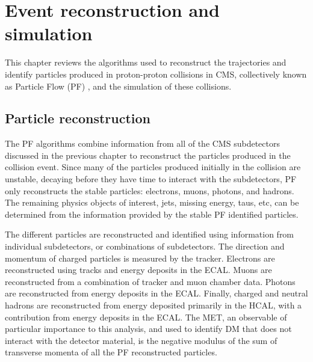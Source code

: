 \chapter{Event reconstruction and simulation}

This chapter reviews the algorithms used to reconstruct the trajectories and identify particles produced in proton-proton collisions in CMS, collectively known as Particle Flow (PF) \cite{CMS:2009nxa}, and the simulation of these collisions.

\section{Particle reconstruction}

The PF algorithms combine information from all of the CMS subdetectors discussed in the previous chapter to reconstruct the particles produced in the collision event. Since many of the particles produced initially in the collision are unstable, decaying before they have time to interact with the subdetectors, PF only reconstructs the stable particles: electrons, muons, photons, and hadrons. The remaining physics objects of interest, jets, missing energy, taus, etc, can be determined from the information provided by the stable PF identified particles. 

\indent The different particles are reconstructed and identified using information from individual subdetectors, or combinations of subdetectors. The direction and momentum of charged particles is measured by the tracker. Electrons are reconstructed using tracks and energy deposits in the ECAL. Muons are reconstructed from a combination of tracker and muon chamber data. Photons are reconstructed from energy deposits in the ECAL. Finally, charged and neutral hadrons are reconstructed from energy deposited primarily in the HCAL, with a contribution from energy deposits in the ECAL. The MET, an observable of particular importance to this analysis, and used to identify DM that does not interact with the detector material, is the negative modulus of the sum of transverse momenta of all the PF reconstructed particles. 

